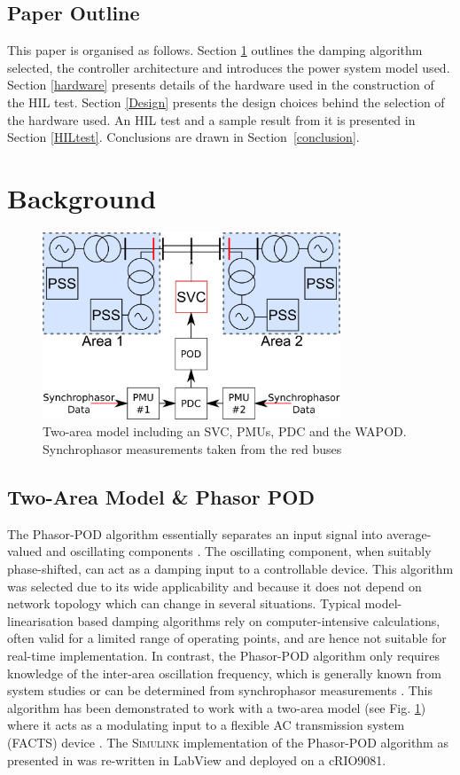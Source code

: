 \documentclass[conference]{IEEEtran}
\begin{document}
\subsection{Paper Outline}
This paper is organised as follows. Section \ref{background} outlines the damping algorithm selected, the controller architecture and introduces the power system model used. Section \ref{hardware} presents details of the hardware used in the construction of the HIL test. Section \ref{Design} presents the design choices behind the selection of the hardware used. An HIL test and a sample result from it is presented in Section \ref{HILtest}. Conclusions are drawn in Section~\ref{conclusion}.

\section{Background}\label{background}

\begin{figure}[!h]
\centering
\includegraphics[width=3.5in]{TwoArea.pdf} 
\caption{Two-area model including an SVC, PMUs, PDC and the WAPOD. Synchrophasor measurements taken from the red buses}
\label{TwoArea}
\end{figure}

\subsection{Two-Area Model \& Phasor POD}
The Phasor-POD algorithm essentially separates an input signal into average-valued and oscillating components \cite{PhasorPOD}. The oscillating component, when suitably phase-shifted, can act as a damping input to a controllable device. This algorithm\cite{PhasorPOD} was selected due to its wide applicability and because it does not depend on network topology which can change in several situations. Typical model-linearisation based damping algorithms rely on computer-intensive calculations, often valid for a limited range of operating points, and are hence not suitable for real-time implementation. In contrast, the Phasor-POD algorithm only requires knowledge of the inter-area oscillation frequency, which is generally known from system studies or can be determined from synchrophasor measurements \cite{TaskForce}. This algorithm has been demonstrated to work with a two-area model (see Fig. \ref{TwoArea}) where it acts as a modulating input to a flexible AC transmission system (FACTS) device \cite{PhasorPODImplement}. The \textsc{Simulink} implementation of the Phasor-POD algorithm as presented in \cite{PhasorPODImplement} was re-written in LabView and deployed on a cRIO9081.
\end{document}
